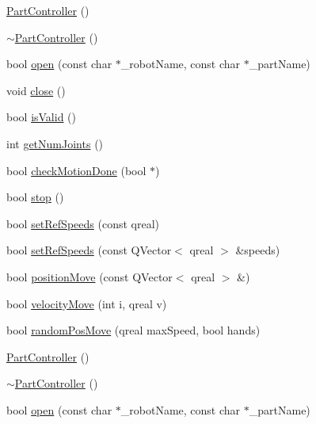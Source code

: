 \begin{DoxyCompactItemize}
\item 
\hyperlink{class_robot_model_1_1_part_controller_a9e5274fba78804eb936fc84048f21e73}{PartController} ()
\item 
\hyperlink{class_robot_model_1_1_part_controller_aee568c7268577894104e0739a99c33f5}{$\sim$PartController} ()
\item 
bool \hyperlink{class_robot_model_1_1_part_controller_a20331379a94c33ef330792e6b9e8b94f}{open} (const char $\ast$\_\-robotName, const char $\ast$\_\-partName)
\item 
void \hyperlink{class_robot_model_1_1_part_controller_a7e0fbd5bd25cebb78cd1b095c2055dac}{close} ()
\item 
bool \hyperlink{class_robot_model_1_1_part_controller_a02d325bdc7bd18023e47f97894a2de49}{isValid} ()
\item 
int \hyperlink{class_robot_model_1_1_part_controller_a2fb04bfb6b1da63201fdaf3dac6591dc}{getNumJoints} ()
\item 
bool \hyperlink{class_robot_model_1_1_part_controller_a4052252cc91ea1387d5a33c968e9a84a}{checkMotionDone} (bool $\ast$)
\item 
bool \hyperlink{class_robot_model_1_1_part_controller_aeb479f7ffd70c0cf80beabf38b1073f7}{stop} ()
\item 
bool \hyperlink{class_robot_model_1_1_part_controller_a3082aaf9c98045fb3309dcaef6416fbe}{setRefSpeeds} (const qreal)
\item 
bool \hyperlink{class_robot_model_1_1_part_controller_a5481c9f2cbbd8370fd2e5b62c38c7d2f}{setRefSpeeds} (const QVector$<$ qreal $>$ \&speeds)
\item 
bool \hyperlink{class_robot_model_1_1_part_controller_aeb2bca8add9b083ebd19d0d2d07fdfd4}{positionMove} (const QVector$<$ qreal $>$ \&)
\item 
bool \hyperlink{class_robot_model_1_1_part_controller_ac5476493b51412c7b6008cf58111543b}{velocityMove} (int i, qreal v)
\item 
bool \hyperlink{class_robot_model_1_1_part_controller_af513e2aa6934bcfeef7d2bf73e9b3cc3}{randomPosMove} (qreal maxSpeed, bool hands)
\item 
\hyperlink{class_robot_model_1_1_part_controller_aa710415b09f5e55af5be9518926c427e}{PartController} ()
\item 
\hyperlink{class_robot_model_1_1_part_controller_a3af4c72e4e237805328951a0b4392a46}{$\sim$PartController} ()
\item 
bool \hyperlink{class_robot_model_1_1_part_controller_ad7344d850243e282749bd9fa5f84df5c}{open} (const char $\ast$\_\-robotName, const char $\ast$\_\-partName)

\end{DoxyCompactItemize}

